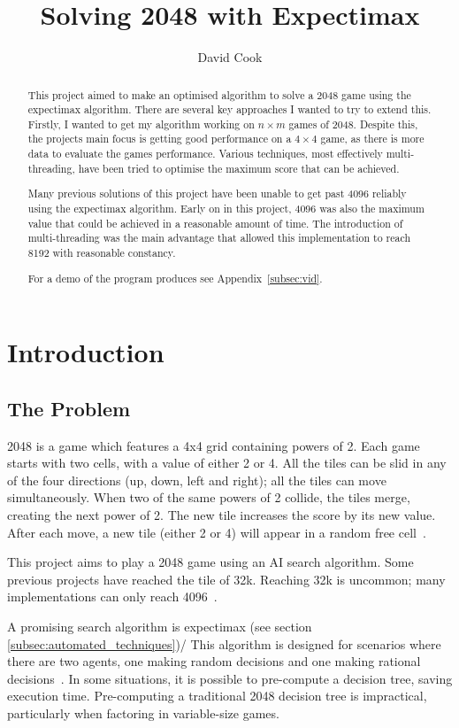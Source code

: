 \documentclass{article}
\title{Solving 2048 with Expectimax}
\author{David Cook}
\begin{document}
\maketitle
\newpage
\tableofcontents
\newpage
\begin{abstract}
This project aimed to make an optimised algorithm to solve a 2048 game using the expectimax algorithm. There are several key approaches I wanted to try to extend this. Firstly, I wanted to get my algorithm working on $n \times m$ games of 2048. Despite this, the project\textquotesingle s main focus is getting good performance on a $4 \times 4$ game, as there is more data to evaluate the game\textquotesingle s performance. Various techniques, most effectively multi-threading, have been tried to optimise the maximum score that can be achieved.

Many previous solutions of this project have been unable to get past 4096 reliably using the expectimax algorithm. Early on in this project, 4096 was also the maximum value that could be achieved in a reasonable amount of time. The introduction of multi-threading was the main advantage that allowed this implementation to reach 8192 with reasonable constancy.

For a demo of the program produces see Appendix~\ref{subsec:vid}.
\end{abstract}
\section{Introduction}
\label{sec:intro}
\subsection{The Problem}
\label{subsec:problem}
2048 is a game which features a 4x4 grid containing powers of 2. Each game starts with two cells, with a value of either 2 or 4.
All the tiles can be slid in any of the four directions (up, down, left and right); all the tiles can move simultaneously. When two of the same powers of 2 collide, the tiles merge, creating the next power of 2. The new tile increases the score by its new value. After each move, a new tile (either 2 or 4) will appear in a random free cell~\cite{game2048}.

This project aims to play a 2048 game using an AI search algorithm. Some previous projects have reached the tile of 32k\cite{_16k2048ai}. Reaching 32k is uncommon; many implementations can only reach 4096~\cite{aiplays2048,expectimax2048}.

A promising search algorithm is expectimax (see section \ref{subsec:automated_techniques})/ This algorithm is designed for scenarios where there are two agents, one making random decisions and one making rational decisions~\cite[~p.200]{russell2010artificial}. In some situations, it is possible to pre-compute a decision tree, saving execution time.
Pre-computing a traditional 2048 decision tree is impractical, particularly when factoring in variable-size games.
\end{document}
